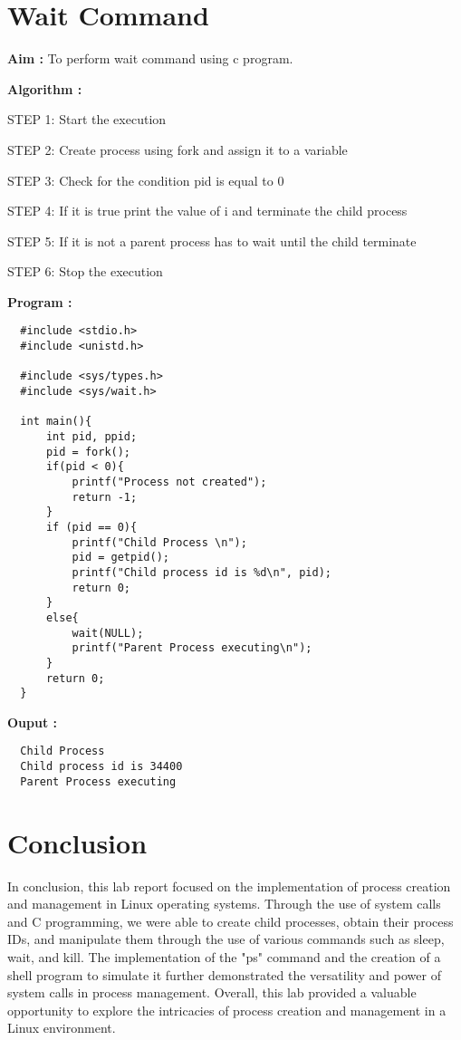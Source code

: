 \documentclass[journal,onecolumn]{IEEEtran}
\begin{document}
\section{Wait Command}
\textbf{Aim : } To perform wait command using c program.

\textbf{Algorithm : }
\begin{list}{}{}
  \item STEP 1: Start the execution
  \item STEP 2: Create process using fork and assign it to a variable
  \item STEP 3: Check for the condition pid is equal to 0
  \item STEP 4: If it is true print the value of i and terminate the child process
  \item STEP 5: If it is not a parent process has to wait until the child terminate
  \item STEP 6: Stop the execution
\end{list}


\textbf{Program : }
\begin{verbatim}
  #include <stdio.h>
  #include <unistd.h>
  
  #include <sys/types.h>
  #include <sys/wait.h>
  
  int main(){
      int pid, ppid;
      pid = fork();
      if(pid < 0){
          printf("Process not created");
          return -1;
      }
      if (pid == 0){
          printf("Child Process \n");
          pid = getpid();
          printf("Child process id is %d\n", pid);
          return 0;
      }
      else{
          wait(NULL);
          printf("Parent Process executing\n");
      }
      return 0;
  }
\end{verbatim}

\textbf{Ouput : }
\begin{verbatim}
  Child Process 
  Child process id is 34400
  Parent Process executing
\end{verbatim}

\section{Conclusion}
In conclusion, this lab report focused on the implementation of process creation and management in Linux operating systems. Through the use of system calls and C programming, we were able to create child processes, obtain their process IDs, and manipulate them through the use of various commands such as sleep, wait, and kill. The implementation of the "ps" command and the creation of a shell program to simulate it further demonstrated the versatility and power of system calls in process management. Overall, this lab provided a valuable opportunity to explore the intricacies of process creation and management in a Linux environment.
\end{document}
